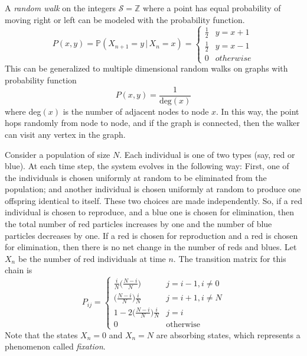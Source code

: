   \begin{example}
    A \textit{random walk} on the integers $\mathcal{S} = \mathbb{Z}$ where a point has equal probability of moving right or left can be modeled with the probability function. 
    \begin{equation}
      P(x, y) = \mathbb{P}(X_{n+1} = y \, | \, X_n = x) = \begin{cases}
      \frac{1}{2} & y = x + 1 \\
      \frac{1}{2} & y = x - 1\\
      0 & otherwise
      \end{cases}
    \end{equation}
    This can be generalized to multiple dimensional random walks on graphs with probability function 
    \begin{equation}
      P(x, y) = \frac{1}{\text{deg}(x)}
    \end{equation}
    where deg$(x)$ is the number of adjacent nodes to node $x$. In this way, the point hops randomly from node to node, and if the graph is connected, then the walker can visit any vertex in the graph. 
  \end{example}

  \begin{example}
    Consider a population of size $N$. Each individual is one of two types (say, red or blue). At each time step, the system evolves in the following way: First, one of the individuals is chosen uniformly at random to be eliminated from the population; and another individual is chosen uniformly at random to produce one offspring identical to itself. These two choices are made independently. So, if a red individual is chosen to reproduce, and a blue one is chosen for elimination, then the total number of red particles increases by one and the number of blue particles decreases by one. If a red is chosen for reproduction and a red is chosen for elimination, then there is no net change in the number of reds and blues. Let $X_n$ be the number of red individuals at time $n$. The transition matrix for this chain is
    \begin{equation}
      P_{i j} = \begin{cases}
      \frac{i}{N} \bigg(\frac{N-i}{N} \bigg) & j=i-1, i \neq 0 \\
      \bigg(\frac{N-i}{N} \bigg) \frac{i}{N} & j=i+1, i \neq N \\
      1 - 2 \bigg(\frac{N-i}{N} \bigg) \frac{i}{N} & j = i \\
      0 & \text{otherwise}
      \end{cases}
    \end{equation}
    Note that the states $X_n = 0$ and $X_n = N$ are absorbing states, which represents a phenomenon called \textit{fixation}. 
  \end{example}

